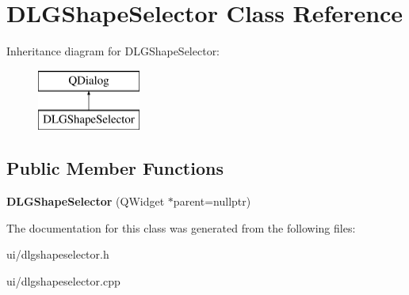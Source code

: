 \hypertarget{class_d_l_g_shape_selector}{}\section{D\+L\+G\+Shape\+Selector Class Reference}
\label{class_d_l_g_shape_selector}
Inheritance diagram for D\+L\+G\+Shape\+Selector\+:\begin{figure}[H]
\begin{center}
\leavevmode
\includegraphics[height=2.000000cm]{class_d_l_g_shape_selector}
\end{center}
\end{figure}
\subsection*{Public Member Functions}
\begin{DoxyCompactItemize}
\item 
\mbox{\label{class_d_l_g_shape_selector_a70c7ab9ba3c2cff579eb2886383dcdab}} 
{\bfseries D\+L\+G\+Shape\+Selector} (Q\+Widget $\ast$parent=nullptr)
\end{DoxyCompactItemize}


The documentation for this class was generated from the following files\+:\begin{DoxyCompactItemize}
\item 
ui/dlgshapeselector.\+h\item 
ui/dlgshapeselector.\+cpp\end{DoxyCompactItemize}
